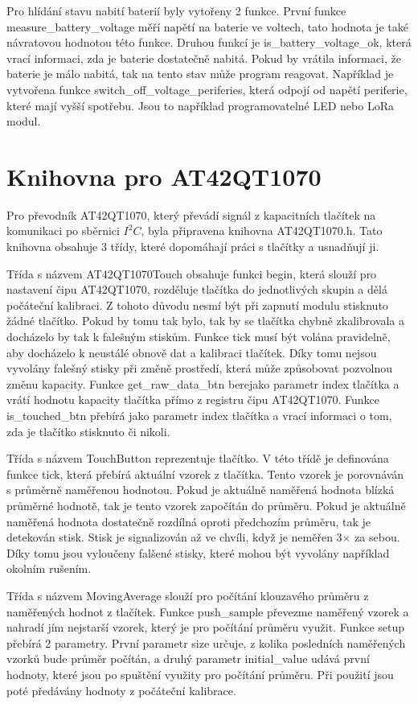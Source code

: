 Pro hlídání stavu nabití baterií byly vytořeny 2 funkce. První funkce measure\_battery\_voltage měří napětí na baterie ve voltech, tato hodnota je také návratovou hodnotou této funkce. Druhou funkcí je 
is\_battery\_voltage\_ok, která vrací informaci, zda je baterie dostatečně nabitá. Pokud by vrátila informaci, že baterie je málo nabitá, tak na tento stav může program reagovat. Například je vytvořena 
funkce switch\_off\_voltage\_periferies, která odpojí od napětí periferie, které mají vyšší spotřebu. Jsou to například programovatelné LED nebo LoRa modul. 

\section{Knihovna pro AT42QT1070}
Pro převodník AT42QT1070, který převádí signál z kapacitních tlačítek na komunikaci po sběrnici $I^2C$, byla připravena knihovna AT42QT1070.h. Tato knihovna obsahuje 3 třídy, které dopomáhají 
práci s tlačítky a usnadňují ji. 

Třída s názvem AT42QT1070Touch obsahuje funkci begin, která slouží pro nastavení čipu AT42QT1070, rozděluje tlačítka do jednotlivých skupin a dělá počáteční kalibraci. Z tohoto důvodu nesmí být při 
zapnutí modulu stisknuto žádné tlačítko. Pokud by tomu tak bylo, tak by se tlačítka chybně zkalibrovala a docházelo by tak k falešným stiskům. Funkce tick musí být volána pravidelně, aby docházelo 
k neustálé obnově dat a kalibraci tlačítek. Díky tomu nejsou vyvolány falešný stisky při změně prostředí, která může způsobovat pozvolnou změnu kapacity. Funkce get\_raw\_data\_btn berejako parametr 
index tlačítka a vrátí hodnotu kapacity tlačítka přímo z registru čipu AT42QT1070. Funkce is\_touched\_btn přebírá jako parametr index tlačítka a vrací informaci o tom, zda je tlačítko stisknuto 
či nikoli.  

Třída s názvem TouchButton reprezentuje tlačítko. V této třídě je definována funkce tick, která přebírá aktuální vzorek z tlačítka. Tento vzorek je porovnáván s průměrně naměřenou hodnotou. Pokud 
je aktuálně naměřená hodnota blízká průměrné hodnotě, tak je tento vzorek započítán do průměru. Pokud je aktuálně naměřená hodnota dostatečně rozdílná oproti předchozím průměru, tak je detekován stisk. 
Stisk je signalizován až ve chvíli, když je neměřen 3$\times$ za sebou. Díky tomu jsou vyloučeny falšené stisky, které mohou být vyvolány například okolním rušením.  

Třída s názvem MovingAverage slouží pro počítání klouzavého průměru z naměřených hodnot z tlačítek. Funkce push\_sample převezme naměřený vzorek a nahradí jím nejstarší vzorek, který je pro počítání 
průměru využit. Funkce setup přebírá 2 parametry. První parametr size určuje, z kolika posledních naměřených vzorků bude průměr počítán, a druhý parametr initial\_value udává první hodnoty, které 
jsou po spuštění využity pro počítání průměru. Při použití jsou poté předávány hodnoty z počáteční kalibrace. 

